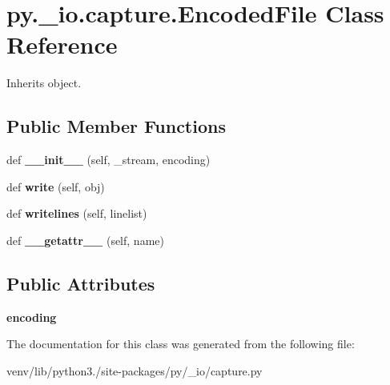 \hypertarget{classpy_1_1__io_1_1capture_1_1_encoded_file}{}\section{py.\+\_\+io.\+capture.\+Encoded\+File Class Reference}
\label{classpy_1_1__io_1_1capture_1_1_encoded_file}


Inherits object.

\subsection*{Public Member Functions}
\begin{DoxyCompactItemize}
\item 
\mbox{\label{classpy_1_1__io_1_1capture_1_1_encoded_file_a603e5b3477642ce97d5fc7b5d75c8ab7}} 
def {\bfseries \+\_\+\+\_\+init\+\_\+\+\_\+} (self, \+\_\+stream, encoding)
\item 
\mbox{\label{classpy_1_1__io_1_1capture_1_1_encoded_file_afd77f3905f5395496107aa86c6ad0455}} 
def {\bfseries write} (self, obj)
\item 
\mbox{\label{classpy_1_1__io_1_1capture_1_1_encoded_file_a621f4af55d2bad1c19df152e5b2a86f7}} 
def {\bfseries writelines} (self, linelist)
\item 
\mbox{\label{classpy_1_1__io_1_1capture_1_1_encoded_file_acda3864e7d5ff04bf3751e82497e7ae3}} 
def {\bfseries \+\_\+\+\_\+getattr\+\_\+\+\_\+} (self, name)
\end{DoxyCompactItemize}
\subsection*{Public Attributes}
\begin{DoxyCompactItemize}
\item 
\mbox{\label{classpy_1_1__io_1_1capture_1_1_encoded_file_a8db7853856e3b52a8ff28f9d56257e9f}} 
{\bfseries encoding}
\end{DoxyCompactItemize}


The documentation for this class was generated from the following file\+:\begin{DoxyCompactItemize}
\item 
venv/lib/python3./site-\/packages/py/\+\_\+io/capture.\+py\end{DoxyCompactItemize}
